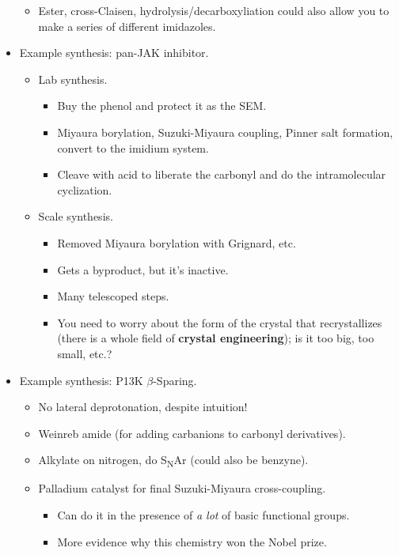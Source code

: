\documentclass[../notes.tex]{subfiles}
\begin{document}
\begin{itemize}
\begin{itemize}
        \item Ester, cross-Claisen, hydrolysis/decarboxyliation could also allow you to make a series of different imidazoles.
    \end{itemize}
    \item Example synthesis: pan-JAK inhibitor.
    \begin{itemize}
        \item Lab synthesis.
        \begin{itemize}
            \item Buy the phenol and protect it as the SEM.
            \item Miyaura borylation, Suzuki-Miyaura coupling, Pinner salt formation, convert to the imidium system.
            \item Cleave with acid to liberate the carbonyl and do the intramolecular cyclization.
        \end{itemize}
        \item Scale synthesis.
        \begin{itemize}
            \item Removed Miyaura borylation with Grignard, etc.
            \item Gets a byproduct, but it's inactive.
            \item Many telescoped steps.
            \item You need to worry about the form of the crystal that recrystallizes (there is a whole field of \textbf{crystal engineering}); is it too big, too small, etc.?
        \end{itemize}
    \end{itemize}
    \item Example synthesis: P13K $\beta$-Sparing.
    \begin{itemize}
        \item No lateral deprotonation, despite intuition!
        \item Weinreb amide (for adding carbanions to carbonyl derivatives).
        \item Alkylate on nitrogen, do S\textsubscript{N}Ar (could also be benzyne).
        \item Palladium catalyst for final Suzuki-Miyaura cross-coupling.
        \begin{itemize}
            \item Can do it in the presence of \emph{a lot} of basic functional groups.
            \item More evidence why this chemistry won the Nobel prize.

\end{itemize}
\end{itemize}
\end{itemize}
\end{document}
